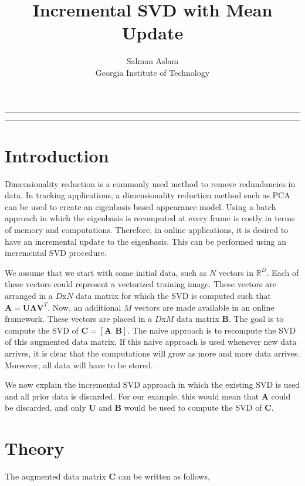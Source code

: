 
\title{Incremental SVD with Mean Update}
\author{Salman Aslam\\ Georgia Institute of Technology}

\maketitle
\rule[0pt]{\textwidth}{1pt}
\tableofcontents
\rule[0pt]{\textwidth}{1pt}
\section{Introduction}
Dimensionality reduction is a commonly used method to remove redundancies in data.  In tracking applications, a dimensionality reduction method such as PCA can be used to create an eigenbasis based appearance model.  Using a batch approach in which the eigenbasis is recomputed at every frame is costly in terms of memory and computations.  Therefore, in online applications, it is desired to have an incremental update to the eigenbasis.  This can be performed using an incremental SVD procedure.

We assume that we start with some initial data, such as $N$ vectors in $\mathbb{R}^D$.  Each of these vectors could represent a vectorized training image.  These vectors are arranged in a $D$x$N$ data matrix for which the SVD is computed such that $\mathbf{A}=\mathbf{U}\mathbf{\Lambda}\mathbf{V}^T$.  Now, an additional $M$ vectors are made available in an online framework.  These vectors are placed in a $D$x$M$ data matrix $\mathbf{B}$.  The goal is to compute the SVD of $\mathbf{C} = [\mathbf{A} \ \ \mathbf{B}]$.  The naive approach is to recompute the SVD of this augmented data matrix.  If this naive approach is used whenever new data arrives, it is clear that the computations will grow as more and more data arrives.  Moreover, all data will have to be stored.

We now explain the incremental SVD approach in which the existing SVD is used and all prior data is discarded.  For our example, this would mean that $\mathbf{A}$ could be discarded, and only $\mathbf{U}$ and $\mathbf{B}$ would be used to compute the SVD of $\mathbf{C}$.

\section{Theory}
The augmented data matrix $\mathbf{C}$ can be written as follows,


